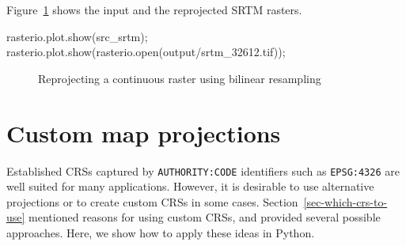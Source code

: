 \documentclass[
  letterpaper,
]{krantz}
\newenvironment{Shaded}{\begin{snugshade}}{\end{snugshade}}
\newcommand{\BuiltInTok}[1]{\textcolor[rgb]{0.00,0.23,0.31}{#1}}
\newcommand{\NormalTok}[1]{\textcolor[rgb]{0.00,0.23,0.31}{#1}}
\newcommand{\OperatorTok}[1]{\textcolor[rgb]{0.37,0.37,0.37}{#1}}
\newcommand{\StringTok}[1]{\textcolor[rgb]{0.13,0.47,0.30}{#1}}
\begin{document}
Figure~\ref{fig-raster-reproject-srtm} shows the input and the
reprojected SRTM rasters.

\begin{Shaded}
\begin{Highlighting}[]
\NormalTok{rasterio.plot.show(src\_srtm)}\OperatorTok{;}
\NormalTok{rasterio.plot.show(rasterio.}\BuiltInTok{open}\NormalTok{(}\StringTok{\textquotesingle{}output/srtm\_32612.tif\textquotesingle{}}\NormalTok{))}\OperatorTok{;}
\end{Highlighting}
\end{Shaded}

\begin{figure}

\begin{minipage}{0.50\linewidth}



\end{minipage}%
%
\begin{minipage}{0.50\linewidth}



\end{minipage}%

\caption{\label{fig-raster-reproject-srtm}Reprojecting a continuous
raster using bilinear resampling}

\end{figure}%

\section{Custom map projections}\label{sec-custom-map-projections}

Established CRSs captured by \texttt{AUTHORITY:CODE} identifiers such as
\texttt{EPSG:4326} are well suited for many applications. However, it is
desirable to use alternative projections or to create custom CRSs in
some cases. Section~\ref{sec-which-crs-to-use} mentioned reasons for
using custom CRSs, and provided several possible approaches. Here, we
show how to apply these ideas in Python.
\end{document}
